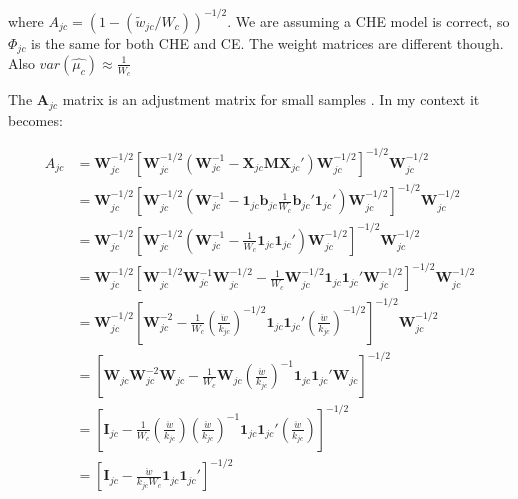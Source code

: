 where $A_{jc} = (1-(\tilde{w}_{jc}/W_c))^{-1/2}$. We are assuming a CHE model is correct, so $\Phi_{jc}$ is the same for both CHE and CE. The weight matrices are different though. Also $var(\hat{\mu_c}) \approx \frac{1}{W_c}$


The $\mathbf{A}_{jc}$ matrix is an adjustment matrix for small samples \autocite{tipton2015b}. In my context it becomes:

\begin{equation}
    \begin{split}
        A_{jc} &= \mathbf{W}_{jc}^{-1/2} \left[\mathbf{W}_{jc}^{-1/2} \left( \mathbf{W}_{jc}^{-1} - \mathbf{X}_{jc}\mathbf{M}\mathbf{X}_{jc}'\right) \mathbf{W}_{jc}^{-1/2}\right]^{-1/2} \mathbf{W}_{jc}^{-1/2} \\
                &= \mathbf{W}_{jc}^{-1/2} \left[\mathbf{W}_{jc}^{-1/2} \left( \mathbf{W}_{jc}^{-1} - \mathbf{1}_{jc}\mathbf{b}_{jc}\frac{1}{W_c}\mathbf{b}_{jc}'\mathbf{1}_{jc}'\right) \mathbf{W}_{jc}^{-1/2}\right]^{-1/2} \mathbf{W}_{jc}^{-1/2} \\
                &= \mathbf{W}_{jc}^{-1/2} \left[\mathbf{W}_{jc}^{-1/2} \left( \mathbf{W}_{jc}^{-1} - \frac{1}{W_c}\mathbf{1}_{jc}\mathbf{1}_{jc}'\right) \mathbf{W}_{jc}^{-1/2}\right]^{-1/2} \mathbf{W}_{jc}^{-1/2} \\   
                &= \mathbf{W}_{jc}^{-1/2} \left[  \mathbf{W}_{jc}^{-1/2}\mathbf{W}_{jc}^{-1}\mathbf{W}_{jc}^{-1/2} - \frac{1}{W_c}\mathbf{W}_{jc}^{-1/2}\mathbf{1}_{jc}\mathbf{1}_{jc}' \mathbf{W}_{jc}^{-1/2}\right]^{-1/2} \mathbf{W}_{jc}^{-1/2} \\ 
                &= \mathbf{W}_{jc}^{-1/2} \left[  \mathbf{W}_{jc}^{-2} - \frac{1}{W_c}\left(\frac{\ddot{w}}{k_{jc}}\right)^{-1/2}\mathbf{1}_{jc}\mathbf{1}_{jc}' \left(\frac{\ddot{w}}{k_{jc}}\right)^{-1/2}\right]^{-1/2} \mathbf{W}_{jc}^{-1/2} \\ 
                &= \left[ \mathbf{W}_{jc}\mathbf{W}_{jc}^{-2}\mathbf{W}_{jc} - \frac{1}{W_c}\mathbf{W}_{jc}\left(\frac{\ddot{w}}{k_{jc}}\right)^{-1}\mathbf{1}_{jc}\mathbf{1}_{jc}'\mathbf{W}_{jc}\right]^{-1/2}  \\ 
                &= \left[ \mathbf{I}_{jc} - \frac{1}{W_c}\left(\frac{\ddot{w}}{k_{jc}}\right)\left(\frac{\ddot{w}}{k_{jc}}\right)^{-1}\mathbf{1}_{jc}\mathbf{1}_{jc}'\left(\frac{\ddot{w}}{k_{jc}}\right)\right]^{-1/2}  \\ 
                &= \left[ \mathbf{I}_{jc} - \frac{\ddot{w}}{k_{jc}W_c}\mathbf{1}_{jc}\mathbf{1}_{jc}'\right]^{-1/2}  \\ 
    \end{split}
    \nonumber
\end{equation}
